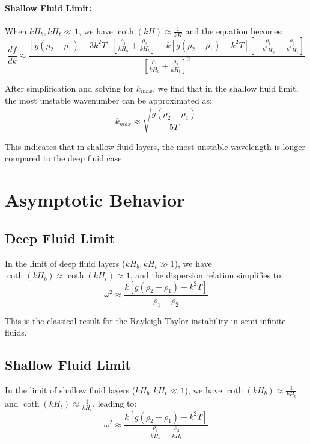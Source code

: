 \documentclass[12pt,a4paper]{article}
\begin{document}
\paragraph{Shallow Fluid Limit:} When $kH_b, kH_t \ll 1$, we have $\coth(kH) \approx \frac{1}{kH}$ and the equation becomes:
\begin{equation}
\frac{df}{dk} \approx \frac{[g(\rho_2 - \rho_1) - 3k^2T][\frac{\rho_1}{kH_b} + \frac{\rho_2}{kH_t}] - k[g(\rho_2 - \rho_1) - k^2T][-\frac{\rho_1}{k^2H_b} - \frac{\rho_2}{k^2H_t}]}{[\frac{\rho_1}{kH_b} + \frac{\rho_2}{kH_t}]^2}
\end{equation}

After simplification and solving for $k_{max}$, we find that in the shallow fluid limit, the most unstable wavenumber can be approximated as:
\begin{equation}
k_{max} \approx \sqrt{\frac{g(\rho_2 - \rho_1)}{5T}}
\end{equation}

This indicates that in shallow fluid layers, the most unstable wavelength is longer compared to the deep fluid case.

\section{Asymptotic Behavior}
\subsection{Deep Fluid Limit}
In the limit of deep fluid layers ($kH_b, kH_t \gg 1$), we have $\coth(kH_b) \approx \coth(kH_t) \approx 1$, and the dispersion relation simplifies to:
\begin{equation}
\omega^2 \approx \frac{k[g(\rho_2 - \rho_1) - k^2T]}{\rho_1 + \rho_2}
\end{equation}

This is the classical result for the Rayleigh-Taylor instability in semi-infinite fluids.

\subsection{Shallow Fluid Limit}
In the limit of shallow fluid layers ($kH_b, kH_t \ll 1$), we have $\coth(kH_b) \approx \frac{1}{kH_b}$ and $\coth(kH_t) \approx \frac{1}{kH_t}$, leading to:
\begin{equation}
\omega^2 \approx \frac{k[g(\rho_2 - \rho_1) - k^2T]}{\frac{\rho_1}{kH_b} + \frac{\rho_2}{kH_t}}
\end{equation}
\end{document}
